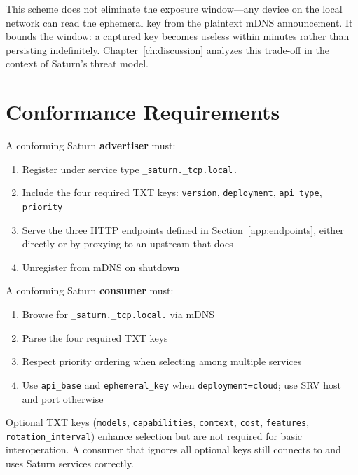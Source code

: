 This scheme does not eliminate the exposure window---any device on the local network can read the ephemeral key from the plaintext mDNS announcement. It bounds the window: a captured key becomes useless within minutes rather than persisting indefinitely. Chapter~\ref{ch:discussion} analyzes this trade-off in the context of Saturn's threat model.

\section{Conformance Requirements}
\label{app:conformance}

A conforming Saturn \textbf{advertiser} must:
\begin{enumerate}
  \item Register under service type \texttt{\_saturn.\_tcp.local.}
  \item Include the four required TXT keys: \texttt{version}, \texttt{deployment}, \texttt{api\_type}, \texttt{priority}
  \item Serve the three HTTP endpoints defined in Section~\ref{app:endpoints}, either directly or by proxying to an upstream that does
  \item Unregister from mDNS on shutdown
\end{enumerate}

A conforming Saturn \textbf{consumer} must:
\begin{enumerate}
  \item Browse for \texttt{\_saturn.\_tcp.local.} via mDNS
  \item Parse the four required TXT keys
  \item Respect priority ordering when selecting among multiple services
  \item Use \texttt{api\_base} and \texttt{ephemeral\_key} when \texttt{deployment=cloud}; use SRV host and port otherwise
\end{enumerate}

Optional TXT keys (\texttt{models}, \texttt{capabilities}, \texttt{context}, \texttt{cost}, \texttt{features}, \texttt{rotation\_interval}) enhance selection but are not required for basic interoperation. A consumer that ignores all optional keys still connects to and uses Saturn services correctly.
